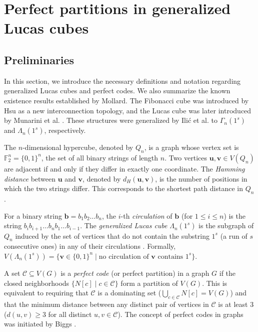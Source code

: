  \section{Perfect partitions in generalized Lucas cubes}\label{ch:lucas}

\subsection{Preliminaries}

In this section, we introduce the necessary definitions and notation regarding generalized Lucas cubes and perfect codes. We also summarize the known existence results established by Mollard. The Fibonacci cube was introduced by Hsu \cite{hsu93} as a new interconnection topology, and the Lucas cube was later introduced by Munarini et al. \cite{mupe2001}. These structures were generalized by Ili\'c et al. \cite{ikr, ikr2012} to $\Gamma_n(1^s)$ and $\Lambda_n(1^s)$, respectively.

\begin{definition}
The $n$-dimensional hypercube, denoted by $Q_n$, is a graph whose vertex set is $\mathbb{F}_2^n = \{0, 1\}^n$, the set of all binary strings of length $n$. Two vertices $\mathbf{u}, \mathbf{v} \in V(Q_n)$ are adjacent if and only if they differ in exactly one coordinate. The \emph{Hamming distance} between $\mathbf{u}$ and $\mathbf{v}$, denoted by $d_H(\mathbf{u}, \mathbf{v})$, is the number of positions in which the two strings differ. This corresponds to the shortest path distance in $Q_n$.
\end{definition}

\begin{definition}
For a binary string $\mathbf{b} = b_1 b_2 \dots b_n$, the $i$-th \emph{circulation} of $\mathbf{b}$ (for $1 \le i \le n$) is the string $b_i b_{i+1} \dots b_n b_1 \dots b_{i-1}$.
The \emph{generalized Lucas cube} $\Lambda_n(1^s)$ is the subgraph of $Q_n$ induced by the set of vertices that do not contain the substring $1^s$ (a run of $s$ consecutive ones) in any of their circulations \cite{ikr2012}. Formally, $V(\Lambda_n(1^s)) = \{ \mathbf{v} \in \{0, 1\}^n \mid \text{no circulation of } \mathbf{v} \text{ contains } 1^s \}$.
\end{definition}

\begin{definition}
A set $\mathcal{C} \subseteq V(G)$ is a \emph{perfect code} (or perfect partition) in a graph $G$ if the closed neighborhoods $\{N[c] \mid c \in \mathcal{C}\}$ form a partition of $V(G)$. This is equivalent to requiring that $\mathcal{C} $ is a dominating set ($ \bigcup_{c \in \mathcal{C} } N[c] = V(G)$) and that the minimum distance between any distinct pair of vertices in $\mathcal{C} $ is at least 3 ($d(u, v) \ge 3$ for all distinct $u, v \in \mathcal{C} $). The concept of perfect codes in graphs was initiated by Biggs \cite{Biggs}.
\end{definition}

